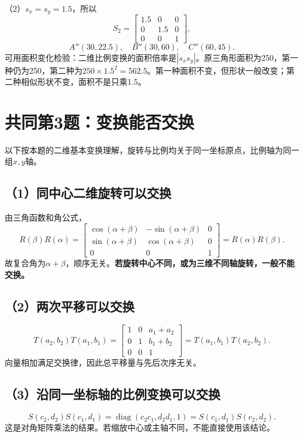 （2）$s_x=s_y=1.5$，所以
\[
S_2=\begin{bmatrix}1.5&0&0\\0&1.5&0\\0&0&1\end{bmatrix},
\]
\[
\boxed{A''(30,22.5),\quad B''(30,60),\quad C''(60,45).}
\]
可用面积变化检验：二维比例变换的面积倍率是$|s_xs_y|$。原三角形面积为250，第一种仍为250，第二种为$250\times1.5^2=562.5$。第一种面积不变，但形状一般改变；第二种相似形状不变，面积不是只乘1.5。


\section{共同第3题：变换能否交换}
\sol 以下按本题的二维基本变换理解，旋转与比例均关于同一坐标原点，比例轴为同一组$x,y$轴。

\subsection*{（1）同中心二维旋转可以交换}
由三角函数和角公式，
\[
R(\beta)R(\alpha)=
\begin{bmatrix}
\cos(\alpha+\beta)&-\sin(\alpha+\beta)&0\\
\sin(\alpha+\beta)&\cos(\alpha+\beta)&0\\
0&0&1
\end{bmatrix}
=R(\alpha)R(\beta).
\]
故复合角为$\alpha+\beta$，顺序无关。\textbf{若旋转中心不同，或为三维不同轴旋转，一般不能交换。}

\subsection*{（2）两次平移可以交换}
\[
T(a_2,b_2)T(a_1,b_1)=
\begin{bmatrix}1&0&a_1+a_2\\0&1&b_1+b_2\\0&0&1\end{bmatrix}
=T(a_1,b_1)T(a_2,b_2).
\]
向量相加满足交换律，因此总平移量与先后次序无关。

\subsection*{（3）沿同一坐标轴的比例变换可以交换}
\[
S(c_2,d_2)S(c_1,d_1)=
\operatorname{diag}(c_2c_1,d_2d_1,1)
=S(c_1,d_1)S(c_2,d_2).
\]
这是对角矩阵乘法的结果。若缩放中心或主轴不同，不能直接使用该结论。

